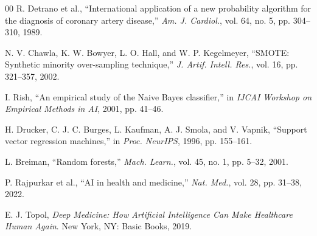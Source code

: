\documentclass[conference]{IEEEtran}
\begin{document}
\begin{thebibliography}{00}
R. Detrano et al., ``International application of a new probability algorithm for the diagnosis of coronary artery disease,'' \emph{Am. J. Cardiol.}, vol. 64, no. 5, pp. 304--310, 1989.

N. V. Chawla, K. W. Bowyer, L. O. Hall, and W. P. Kegelmeyer, ``SMOTE: Synthetic minority over-sampling technique,'' \emph{J. Artif. Intell. Res.}, vol. 16, pp. 321--357, 2002.

I. Rish, ``An empirical study of the Naive Bayes classifier,'' in \emph{IJCAI Workshop on Empirical Methods in AI}, 2001, pp. 41--46.

H. Drucker, C. J. C. Burges, L. Kaufman, A. J. Smola, and V. Vapnik, ``Support vector regression machines,'' in \emph{Proc. NeurIPS}, 1996, pp. 155--161.

L. Breiman, ``Random forests,'' \emph{Mach. Learn.}, vol. 45, no. 1, pp. 5--32, 2001.

P. Rajpurkar et al., ``AI in health and medicine,'' \emph{Nat. Med.}, vol. 28, pp. 31--38, 2022.

E. J. Topol, \emph{Deep Medicine: How Artificial Intelligence Can Make Healthcare Human Again}. New York, NY: Basic Books, 2019.
\end{thebibliography}
\end{document}
